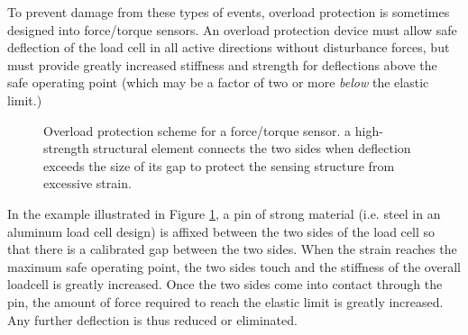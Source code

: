To prevent damage from these types of events, overload protection is
sometimes designed into force/torque sensors. An overload protection
device must allow safe deflection of the load cell in all active directions
without disturbance forces, but must provide greatly increased stiffness
and strength for deflections above the safe operating point (which may
be a factor of two or more {\it below} the elastic limit.)
%

\begin{figure}[ht]	%
\begin{center}
\caption{ Overload protection scheme for a force/torque sensor.	%
 a high-strength structural element connects the two sides	%
 when deflection exceeds the size of its gap to protect the	%
sensing structure from excessive strain. }\label{Overload}	%
\end{center}
\end{figure}	%
In the example illustrated in Figure \ref{Overload}, a pin of strong material (i.e.
steel in an aluminum load cell design) is affixed between the two
sides of the load cell so that there is a calibrated gap between the
two sides. When the strain reaches the maximum safe operating point,
the two sides touch and the stiffness of the overall loadcell is greatly
increased.  Once the two sides come into contact through the pin,
the amount of force required to reach the elastic limit is greatly
increased. Any further deflection is thus reduced or eliminated.





